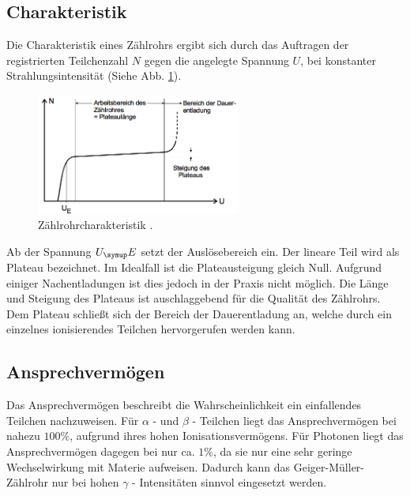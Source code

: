 \subsection{Charakteristik}
Die Charakteristik eines Zählrohrs ergibt sich durch das Auftragen der registrierten
Teilchenzahl $N$ gegen die angelegte Spannung $U$, bei konstanter Strahlungsintensität
(Siehe Abb. \ref{fig:plateau}).
\begin{figure}
  \centering
  \includegraphics[width=0.6\textwidth]{bilder/plateau}
  \caption{Zählrohrcharakteristik \cite{703}.}
  \label{fig:plateau}
\end{figure}
Ab der Spannung $U_\su{E}$ setzt der Auslösebereich ein. Der lineare Teil wird als
Plateau bezeichnet. Im Idealfall ist die Plateausteigung gleich Null. Aufgrund
einiger Nachentladungen ist dies jedoch in der Praxis nicht möglich. Die Länge und
Steigung des Plateaus ist auschlaggebend für die Qualität des Zählrohrs. Dem Plateau
schließt sich der Bereich der Dauerentladung an, welche durch ein einzelnes ionisierendes
Teilchen hervorgerufen werden kann.

\subsection{Ansprechvermögen}
Das Ansprechvermögen beschreibt die Wahrscheinlichkeit ein einfallendes Teilchen
nachzuweisen. Für $\alpha$ - und $\beta$ - Teilchen liegt das Ansprechvermögen bei
nahezu $100 \%$, aufgrund ihres hohen Ionisationsvermögens.
Für Photonen liegt das Ansprechvermögen dagegen bei nur ca. $1 \%$, da sie nur eine
sehr geringe Wechselwirkung mit Materie aufweisen. Dadurch kann das Geiger-Müller-Zählrohr
nur bei hohen $\gamma$ - Intensitäten sinnvol eingesetzt werden.
